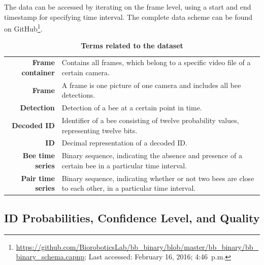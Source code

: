 \newpage
The data can be accessed by iterating on the frame level, using a start and end time\-stamp for specifying time interval. The complete data scheme can be found on GitHub\footnote{\url{https://github.com/BioroboticsLab/bb_binary/blob/master/bb_binary/bb_binary_schema.capnp}; Last accessed: February 16, 2016; 4:46~p.m.}.


\begin{table}[!t]
\small
\caption[Terms related to the dataset]{\textbf{Terms related to the dataset}}
\label{tab:dataset}
\vspace{3mm}
\colorbox{usethiscolorhere}{
\centering
\begin{tabularx}{\textwidth}{@{} r Y @{}}
	\textbf{Frame container} &
	Contains all frames, which belong to a specific video file of a certain camera.\vspace{2mm}\\
	\textbf{Frame} &
	A frame is one picture of one camera and includes all bee detections.\vspace{2mm}\\
	\textbf{Detection} &
	Detection of a bee at a certain point in time.\vspace{2mm}\\
	\textbf{Decoded ID} &
	Identifier of a bee consisting of twelve probability values, representing twelve bits.\vspace{2mm}\\
	\textbf{ID} &
	Decimal representation of a decoded ID.\vspace{2mm}\\
	\textbf{Bee time series} & Binary sequence, indicating the absence and presence of a certain bee in a particular time interval.\vspace{2mm}\\
	\textbf{Pair time series} & Binary sequence, indicating whether or not two bees are close to each other, in a particular time interval.\\
\end{tabularx}
}
\end{table}
\subsection{ID Probabilities, Confidence Level, and Quality}
\label{subsec:confidence}


